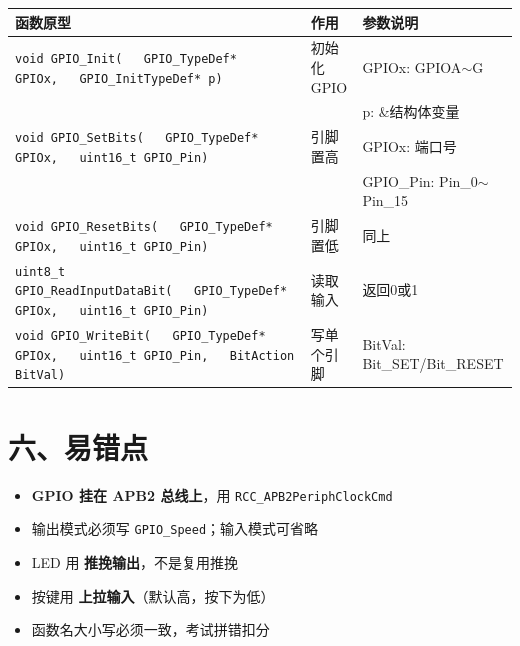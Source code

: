 \documentclass[10pt,a4paper,oneside]{ctexart}
\newcommand{\danger}[1]{\textcolor{accent}{\textbf{#1}}}
\begin{document}
\begin{center}
\begin{tabular}{@{}p{5.5cm}p{2cm}p{3.5cm}@{}}
    \toprule
    \textbf{函数原型} & \textbf{作用} & \textbf{参数说明} \\
    \midrule
    \texttt{void GPIO\_Init(}\newline\texttt{~~~GPIO\_TypeDef* GPIOx,}\newline\texttt{~~~GPIO\_InitTypeDef* p)} & 初始化GPIO & GPIOx: GPIOA$\sim$G \\
     &  & p: \&结构体变量 \\
    \midrule
    \texttt{void GPIO\_SetBits(}\newline\texttt{~~~GPIO\_TypeDef* GPIOx,}\newline\texttt{~~~uint16\_t GPIO\_Pin)} & 引脚置高 & GPIOx: 端口号 \\
     &  & GPIO\_Pin: Pin\_0$\sim$Pin\_15 \\
    \midrule
    \texttt{void GPIO\_ResetBits(}\newline\texttt{~~~GPIO\_TypeDef* GPIOx,}\newline\texttt{~~~uint16\_t GPIO\_Pin)} & 引脚置低 & 同上 \\
    \midrule
    \texttt{uint8\_t GPIO\_ReadInputDataBit(}\newline\texttt{~~~GPIO\_TypeDef* GPIOx,}\newline\texttt{~~~uint16\_t GPIO\_Pin)} & 读取输入 & 返回0或1 \\
    \midrule
    \texttt{void GPIO\_WriteBit(}\newline\texttt{~~~GPIO\_TypeDef* GPIOx,}\newline\texttt{~~~uint16\_t GPIO\_Pin,}\newline\texttt{~~~BitAction BitVal)} & 写单个引脚 & BitVal: Bit\_SET/Bit\_RESET \\
    \bottomrule
\end{tabular}
\end{center}

\section*{六、易错点}

\begin{warnbox}
    \begin{itemize}
        \item \danger{GPIO 挂在 APB2 总线上}，用 \texttt{RCC\_APB2PeriphClockCmd}
        \item 输出模式必须写 \texttt{GPIO\_Speed}；输入模式可省略
        \item LED 用 \textbf{推挽输出}，不是复用推挽
        \item 按键用 \textbf{上拉输入}（默认高，按下为低）
        \item 函数名大小写必须一致，考试拼错扣分
    \end{itemize}
\end{warnbox}
\end{document}
